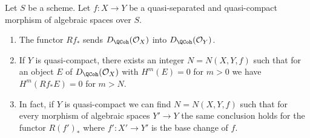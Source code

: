 \begin{lemma}
\label{lemma-quasi-coherence-direct-image}
Let $S$ be a scheme. Let $f : X \to Y$ be a quasi-separated and quasi-compact
morphism of algebraic spaces over $S$.
\begin{enumerate}
\item The functor $Rf_*$ sends $D_\QCoh(\mathcal{O}_X)$
into $D_\QCoh(\mathcal{O}_Y)$.
\item If $Y$ is quasi-compact, there exists an integer $N = N(X, Y, f)$
such that for an object $E$ of $D_\QCoh(\mathcal{O}_X)$
with $H^m(E) = 0$ for $m > 0$ we have
$H^m(Rf_*E) = 0$ for $m > N$.
\item In fact, if $Y$ is quasi-compact we can find $N = N(X, Y, f)$
such that for every morphism of algebraic spaces $Y' \to Y$
the same conclusion holds for the functor $R(f')_*$
where $f' : X' \to Y'$ is the base change of $f$.
\end{enumerate}
\end{lemma}

